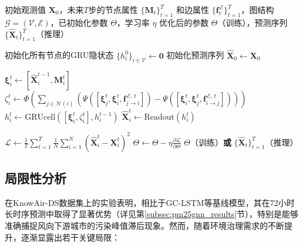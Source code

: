 \begin{algorithm}[htbp]
\caption{\ModelPred{}模型训练与推理流程}
\caption*{\textbf{\ModelPred}：算法包含初始化、自回归预测循环、MSE损失计算和参数更新四个阶段。预测循环中依次进行节点特征构建、净通量聚合、GRU状态更新和浓度预测。}
\label{alg:pm25_gnn}
\begin{algorithmic}[1]
    \REQUIRE 初始观测值 $\mathbf{X}_{0}$，未来$T$步的节点属性 $\{\mathbf{M}_t\}_{t=1}^T$ 和边属性 $\{\mathbf{f}^{\,\mathcal{E}}_t\}_{t=1}^T$，图结构 $\mathcal{G}=(\mathcal{V}, \mathcal{E})$，已初始化参数 $\Theta$，学习率 $\eta$
    \ENSURE 优化后的参数 $\Theta$（训练），预测序列 $\{\hat{\mathbf{X}}_t\}_{t=1}^T$（推理）

    \STATE 初始化所有节点的GRU隐状态 $\{h_i^0\}_{i \in \mathcal{V}} \leftarrow \mathbf{0}$
    \STATE 初始化预测序列 $\hat{\mathbf{X}}_0 \leftarrow \mathbf{X}_0$
    
            \STATE $\boldsymbol{\xi}_i^t \leftarrow [\hat{\mathbf{X}}_i^{t-1}, \mathbf{M}_i^t]$ 
            \STATE $\zeta_i^t \leftarrow \Phi(\sum_{j\in \mathcal{N}(i)}(\Psi([\boldsymbol{\xi}_j^t, \boldsymbol{\xi}_i^t, \mathbf{f}^{\,\mathcal{E},\,t}_{j\to i}]) - \Psi([\boldsymbol{\xi}_i^t, \boldsymbol{\xi}_j^t, \mathbf{f}^{\,\mathcal{E},\,t}_{i\to j}])))$ 
            \STATE $h_i^t \leftarrow \text{GRUcell}([\boldsymbol{\xi}_i^t, \zeta_i^t], h_i^{t-1})$ 
            \STATE $\hat{\mathbf{X}}_i^t \leftarrow \text{Readout}(h_i^t)$ 
        \ENDFOR
    \ENDFOR

    \STATE $\mathcal{L} \leftarrow \frac{1}{T} \sum_{t=1}^{T}\frac{1}{N} \sum_{i=1}^{N}(\hat{\mathbf{X}}_i^t - \mathbf{X}_i^t)^{2}$ 
    \STATE $\Theta \leftarrow \Theta - \eta \frac{\partial \mathcal{L}}{\partial \Theta}$
    \STATE \RETURN $\Theta$（训练）\textbf{或} $\{\hat{\mathbf{X}}_t\}_{t=1}^T$（推理）
\end{algorithmic}
\end{algorithm}


\subsection{局限性分析}
\label{subsec:pm25gnn_limitation}

\ModelPred{}在KnowAir-DS数据集上的实验表明，相比于GC-LSTM等基线模型，其在72小时\PM 长时序预测中取得了显著优势（详见第\ref{subsec:pm25gnn_results}节），特别是能够准确捕捉风向下游城市的污染峰值滞后现象。然而，随着环境治理需求的不断提升，\ModelPred{}逐渐显露出若干关键局限：

